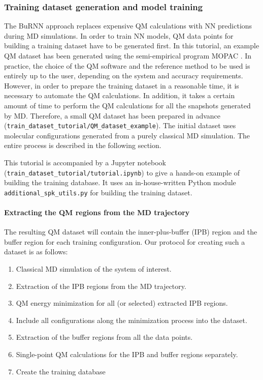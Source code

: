 \subsubsection{Training dataset generation and model training}
The BuRNN approach replaces expensive QM calculations with NN predictions during MD simulations. In order to train NN models, QM data points for building a training dataset have to be generated first. In this tutorial, an example QM dataset has been generated using the semi-empirical program MOPAC \cite{Stewart1990MOPAC, Stewart2013MOPAC}. In practice, the choice of the QM software and the reference method to be used is entirely up to the user, depending on the system and accuracy requirements. However, in order to prepare the training dataset in a reasonable time, it is necessary to automate the QM calculations. In addition, it takes a certain amount of time to perform the QM calculations for all the snapshots generated by MD. Therefore, a small QM dataset has been prepared in advance (\texttt{train\_dataset\_tutorial/QM\_dataset\_example}). The initial dataset uses molecular configurations generated from a purely classical MD simulation. The entire process is described in the following section.


This tutorial is accompanied by a Jupyter notebook (\texttt{train\_dataset\_tutorial/tutorial.ipynb}) to give a hands-on example of building the training database. It uses an in-house-written Python module {\texttt{additional\_spk\_utils.py}} for building the training dataset.


\paragraph{Extracting the QM regions from the MD trajectory}
The resulting QM dataset will contain the inner-plus-buffer (IPB) region and the buffer region for each training configuration. Our protocol for creating such a dataset is as follows: 
\begin{enumerate}
    \item Classical MD simulation of the system of interest.
    \item Extraction of the IPB regions from the MD trajectory.
    \item QM energy minimization for all (or selected) extracted IPB regions.
    \item Include all configurations along the minimization process into the dataset.
    \item Extraction of the buffer regions from all the data points.
    \item Single-point QM calculations for the IPB and buffer regions separately.
    \item Create the training database
\end{enumerate}


